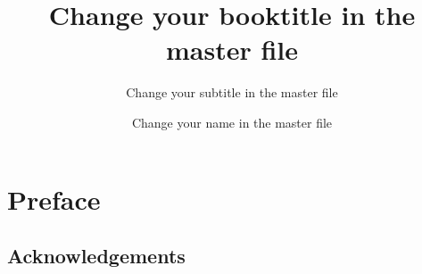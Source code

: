 \documentclass[number=?? %
                ,series=lnls, %
                ,isbn=xxx-x-xxxxxx-xx-x, %
                ,url=http://langsci-press.org/catalog/book/0, %
	        ,output=long    %
	        ,draftmode  
		  ]{LSP/langsci}
\title{Change your booktitle in the master file}  %
\subtitle{Change your subtitle in the master file}
\author{Change your name in the master file}
\begin{document}
               
                           
\maketitle                

\frontmatter

\chapter*{Preface} 
\section*{Acknowledgements} 

\tableofcontents      

\mainmatter         
 

% 









   
 


\backmatter


                               
\end{document}
